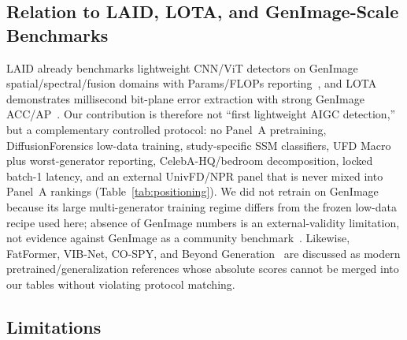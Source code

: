 \subsection{Relation to LAID, LOTA, and GenImage-Scale Benchmarks}

LAID already benchmarks lightweight CNN/ViT detectors on GenImage spatial/spectral/fusion domains with Params/FLOPs reporting~\cite{chivaran2025laid}, and LOTA demonstrates millisecond bit-plane error extraction with strong GenImage ACC/AP~\cite{wang2025lota}.
Our contribution is therefore not ``first lightweight AIGC detection,'' but a complementary controlled protocol: no Panel~A pretraining, DiffusionForensics low-data training, study-specific SSM classifiers, UFD Macro plus worst-generator reporting, CelebA-HQ/bedroom decomposition, locked batch-1 latency, and an external UnivFD/NPR panel that is never mixed into Panel~A rankings (Table~\ref{tab:positioning}).
We did not retrain on GenImage because its large multi-generator training regime differs from the frozen low-data recipe used here; absence of GenImage numbers is an external-validity limitation, not evidence against GenImage as a community benchmark~\cite{zhu2023genimage}.
Likewise, FatFormer, VIB-Net, CO-SPY, and Beyond Generation~\cite{liu2024fatformer,zhang2025vib,cheng2025cospy,zhong2025beyond} are discussed as modern pretrained/generalization references whose absolute scores cannot be merged into our tables without violating protocol matching.

\subsection{Limitations}

